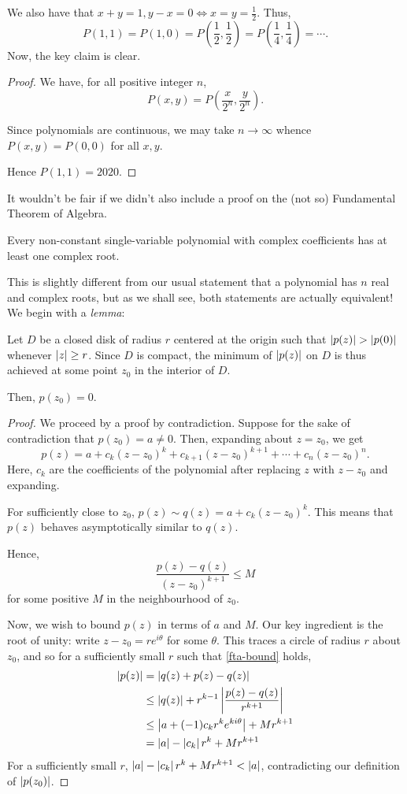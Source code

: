 \documentclass[../jarvis.tex]{subfiles}
\begin{document}
We also have that $x+y=1, y-x=0 \iff x=y=\frac{1}{2}$. Thus,
$$P(1,1)=P(1,0)=P\left(\frac{1}{2},\frac{1}{2}\right)=P\left(\frac{1}{4},\frac{1}{4}\right)=\cdots.$$ Now, the key claim is clear.
\begin{proof}
    We have, for all positive integer $n$, $$P(x,y)=P\left(\frac{x}{2^n},\frac{y}{2^n}\right).$$

    Since polynomials are continuous, we may take $n\to\infty$ whence $P(x,y)=P(0,0)$ for all $x,y$.

    Hence $P(1,1)=\boxed{2020}$.
\end{proof} 
It wouldn't be fair if we didn't also include a proof on the (not so) Fundamental Theorem of Algebra.
\begin{theorem}
    Every non-constant single-variable polynomial with complex coefficients has at least one complex root.
\end{theorem}
This is slightly different from our usual statement that a polynomial has $n$ real and complex roots, but as we shall see, both statements are actually equivalent! We begin with a \textit{lemma}:
\begin{lemma}
Let $D$ be a closed disk of radius $r$ centered at the origin such that $\left\lvert p(z) \right\rvert>\left\lvert p(0) \right\rvert$ whenever $\left\lvert z \right\rvert\geq r$. Since $D$ is compact, the minimum of $\left\lvert p(z) \right\rvert$ on $D$ is thus achieved at some point $z_0$ in the interior of $D$.

Then, $p(z_0)=0$.
\end{lemma}
\begin{proof}
    We proceed by a proof by contradiction. Suppose for the sake of contradiction that $p(z_0)=a\neq 0$. Then, expanding about $z=z_0$, we get
    $$p(z)=a+c_k(z-z_0)^k+c_{k+1}(z-z_0)^{k+1}+\cdots+c_n(z-z_0)^n.$$ Here, $c_k$ are the coefficients of the polynomial after replacing $z$ with $z-z_0$ and expanding.

    For sufficiently close to $z_0$, 
    $p(z)\sim q(z)=a+c_k(z-z_0)^k.$ This means that $p(z)$ behaves asymptotically similar to $q(z)$.

    Hence,
    \begin{equation}\label{fta-bound}
        \frac{p(z)-q(z)}{(z-z_0)^{k+1}}\leq M
    \end{equation} for some positive $M$ in the neighbourhood of $z_0$. 
    
    Now, we wish to bound $p(z)$ in terms of $a$ and $M$. Our key ingredient is the root of unity: write $z-z_0=re^{i\theta}$ for some $\theta$. This traces a circle of radius $r$ about $z_0$, and so for a sufficiently small $r$ such that \eqref{fta-bound} holds,
    \begin{align*}
        \left\lvert p(z) \right\rvert&=\left\lvert q(z)+p(z)-q(z) \right\rvert \\
            &\leq \left\lvert q(z) \right\rvert+r^{k-1}\left\lvert \frac{p(z)-q(z)}{r^{k+1}} \right\rvert\\
            &\leq \left\lvert a+(-1)c_kr^ke^{ki\theta} \right\rvert+Mr^{k+1} \\
            &=\left\lvert a \right\rvert-\left\lvert c_k \right\rvert r^k+Mr^{k+1}
    \end{align*}
    For a sufficiently small $r$, $\left\lvert a \right\rvert-\left\lvert c_k \right\rvert r^k+Mr^{k+1}<\left\lvert a \right\rvert$, contradicting our definition of $\left\lvert p(z_0) \right\rvert$.
\end{proof}
\end{document}
